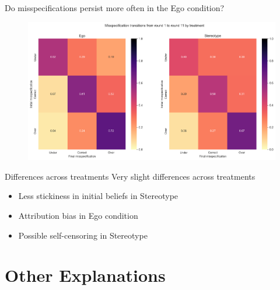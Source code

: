 \documentclass[aspectratio=169]{beamer}
\begin{document}
\begin{frame}{Do misspecifications persist more often in the Ego condition?}

        \begin{figure}
            \centering
            \includegraphics[scale=.3]{misspecification_transitions_treatment.png}
        \end{figure}
\end{frame}


\begin{frame}{Differences across treatments}
    Very slight differences across treatments\\
    \begin{itemize}
        \item Less stickiness in initial beliefs in Stereotype
        \item Attribution bias in Ego condition
        \item Possible self-censoring in Stereotype
    \end{itemize}


\end{frame}

\section*{Other Explanations}
\end{document}
